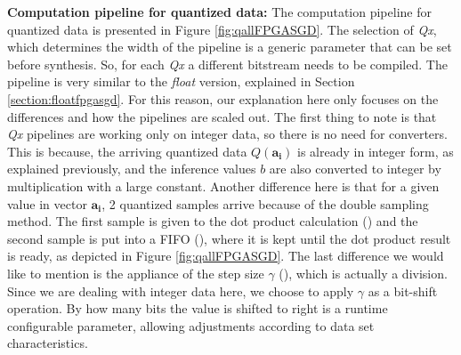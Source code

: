 \documentclass{article}
\newcommand*\circled[1]{\tikz[baseline=(char.base)]{
\node[shape=circle,draw,color=black,text=black,inner sep=0.05pt](char){#1};}}
\begin{document}
\noindent
\textbf{Computation pipeline for quantized data:} The computation pipeline for quantized data is presented in Figure \ref{fig:qallFPGASGD}. The selection of \textit{Qx}, which determines the width of the pipeline is a generic parameter that can be set before synthesis. So, for each \textit{Qx} a different bitstream needs to be compiled. The pipeline is very similar to the \textit{float} version, explained in Section \ref{section:floatfpgasgd}. For this reason, our explanation here only focuses on the differences and how the pipelines are scaled out. The first thing to note is that \textit{Qx} pipelines are working only on integer data, so there is no need for converters. This is because, the arriving quantized data $Q(\mathbf{a_i})$ is already in integer form, as explained previously, and the inference values $b$ are also converted to integer by multiplication with a large constant. Another difference here is that for a given value in vector $\mathbf{a_i}$, 2 quantized samples arrive because of the double sampling method. The first sample is given to the dot product calculation (\circled{1}) and the second sample is put into a FIFO (\circled{A}), where it is kept until the dot product result is ready, as depicted in Figure \ref{fig:qallFPGASGD}. The last difference we would like to mention is the appliance of the step size $\gamma$ (\circled{2}), which is actually a division. Since we are dealing with integer data here, we choose to apply $\gamma$ as a bit-shift operation. By how many bits the value is shifted to right is a runtime configurable parameter, allowing adjustments according to data set characteristics.
\end{document}
